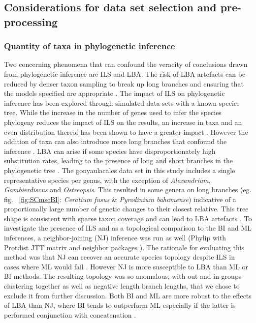 \documentclass[fleqn,10pt,lineno]{wlpeerj} %
\begin{document}
\subsection*{Considerations for data set selection and pre-processing}
\subsubsection*{Quantity of taxa in phylogenetic inference}
Two concerning phenomena that can confound the veracity of conclusions drawn from phylogenetic inference are ILS and LBA. 
The risk of LBA artefacts can be reduced by denser taxon sampling to break up long branches and ensuring that the models specified are appropriate \citep{heath2008taxon}. 
The impact of ILS on phylogenetic inference has been explored through simulated data sets with a known species tree. 
While the increase in the number of genes used to infer the species phylogeny reduces the impact of ILS on the results, an increase in taxa and an even distribution thereof has been shown to have a greater impact \citep{maddison2006inferring}.
However the addition of taxa can also introduce more long branches that confound the inference \citep{heath2008taxon}. 
LBA can arise if some species have disproportionately high substitution rates, leading to the presence of long and short branches in the phylogenetic tree \citep{liu2014coalescent}. 
The gonyaulacales data set in this study includes a single representative species per genus, with the exception of \textit{Alexandrium}, \textit{Gambierdiscus} and \textit{Ostreopsis}. 
This resulted in some genera on long branches (eg. fig. ~\ref{fig:SCmscBI}: \textit{Ceratium fusus} \& \textit{Pyrodinium bahamense}) indicative of a proportionally large number of genetic changes to their closest relative.
This tree shape is consistent with sparse taxon coverage and can lead to LBA artefacts \citep{heath2008taxon}. 
To investigate the presence of ILS and as a topological comparison to the BI and ML inferences, a neighbor-joining (NJ) inference was run as well (Phylip with Protdist JTT matrix and neighbor packages \citep{felsenstein2005phylip}). 
The rationale for evaluating this method was that NJ can recover an accurate species topology despite ILS in cases where ML would fail  \citep{mendes2017concatenation}.
However NJ is more susceptible to LBA than ML or BI methods. 
The resulting topology was so anomalous, with out and in-groups clustering together as well as negative length branch lengths, that we chose to exclude it from further discussion. 
Both BI and ML are more robust to the effects of LBA than NJ, where BI tends to outperform ML especially if the latter is performed conjunction with concatenation \citep{kubatko2007inconsistency,roch2015likelihood}. 
\end{document}
